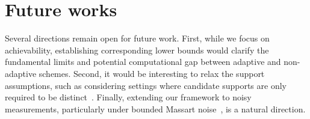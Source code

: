\documentclass{article}
\newcommand{\xl}[1]{{\color{blue}#1}}
\begin{document}
    





\section{Future works}\label{sec:conclusion}

Several directions remain open for future work. First, while we focus on achievability, establishing corresponding lower bounds would clarify the fundamental limits and potential computational gap between adaptive and non-adaptive schemes. Second, it would be interesting to relax the support assumptions, such as considering settings where candidate supports are only required to be distinct~\cite{pal2021support,polyanskii2021learning}. Finally, extending our framework to noisy measurements, particularly under bounded Massart noise~\cite{awasthi2016learning}, is a natural direction.
\end{document}
